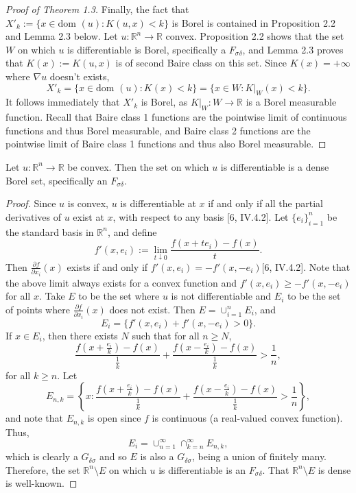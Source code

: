 \documentclass[10pt]{article}
\newenvironment{proposition}[2][Proposition]{\begin{trivlist}
\item[\hskip \labelsep {\bfseries #1}\hskip \labelsep {\bfseries #2.}]}{\end{trivlist}}
\begin{document}
\begin{proof}[Proof of Theorem 1.3]
Finally, the fact that $X'_{k}:=\{ x\in \text{dom } (u) : K(u,x)<k  \}$ is Borel is contained in Proposition 2.2 and Lemma 2.3 below. Let $u: \mathbb{R}^n\rightarrow \mathbb{R}$ convex. Proposition 2.2 shows that the set $W$ on which $u$ is differentiable is Borel, specifically a $F_{\sigma \delta}$, and Lemma 2.3 proves that $K(x):=K(u,x)$ is of second Baire class on this set. Since $K(x)= +\infty$ where $\nabla u$ doesn't exists, $$X'_{k}=\{ x\in \text{dom } (u) : K(x)<k  \} =\{ x\in W : K|_W(x)<k  \}.$$ It follows immediately that $X'_k$ is Borel, as $K|_W : W \rightarrow \mathbb{R}$ is a Borel measurable function. Recall that Baire class 1 functions are the pointwise limit of continuous functions and thus Borel measurable, and Baire class 2 functions are the pointwise limit of Baire class 1 functions and thus also Borel measurable.
\end{proof}
\begin{proposition}{2.2}
Let $u:\mathbb{R}^n\rightarrow \mathbb{R}$ be convex. Then the set on which $u$ is differentiable is a dense Borel set, specifically an $F_{\sigma \delta}$.
\end{proposition}
\begin{proof}
Since $u$ is convex, $u$ is differentiable at $x$ if and only if all the partial derivatives of $u$ exist at $x$, with respect to any basis [6, IV.4.2]. Let $\{e_i\}_{i=1}^{n}$ be the standard basis in $\mathbb{R}^n$, and define 
$$f'(x,e_i):= \lim_{t\downarrow 0} \dfrac{f(x+te_i)- f(x)}{t}.$$
Then $\frac{\partial f}{\partial x_i}(x)$ exists if and only if $f'(x,e_i)=-f'(x,-e_i)$[6, IV.4.2]. Note that the above limit always exists for a convex function and $f'(x,e_i)\geq -f'(x,-e_i)$ for all $x$. Take $E$ to be the set where $u$ is not differentiable and $E_i$ to be the set of points where $\frac{\partial f}{\partial x_i}(x)$ does not exist. Then $E=\cup_{i=1}^n E_i$, and 
$$E_i = \{ f'(x,e_i)+f'(x,-e_i)>0  \}.$$
If $x\in E_i$, then there exists $N$ such that for all $n\geq N$, 
$$\dfrac{f(x+\frac{e_i}{k})- f(x)}{\frac{1}{k}} + \dfrac{f(x-\frac{e_i}{k})- f(x)}{\frac{1}{k}} > \dfrac{1}{n},$$
for all $k\geq n$.
Let 
$$ E_{n,k}=\left\{ x: \frac{f(x+\frac{e_i}{k})- f(x)}{\frac{1}{k}} + \frac{f(x-\frac{e_i}{k})- f(x)}{\frac{1}{k}} > \frac{1}{n}   \right\},$$ and note that $E_{n,k}$ is open since $f$ is continuous (a real-valued convex function).
Thus, $$E_i = \cup_{n=1}^\infty \cap _{k=n}^\infty E_{n,k},$$ which is clearly a $G_{\delta \sigma}$ and so $E$ is also a $G_{\delta \sigma}$, being a union of finitely many. Therefore, the set $\mathbb{R}^n \setminus E$ on which $u$ is differentiable  is an $F_{\sigma \delta}.$ That $\mathbb{R}^n \setminus E$ is dense is well-known.
\end{proof}
\end{document}
